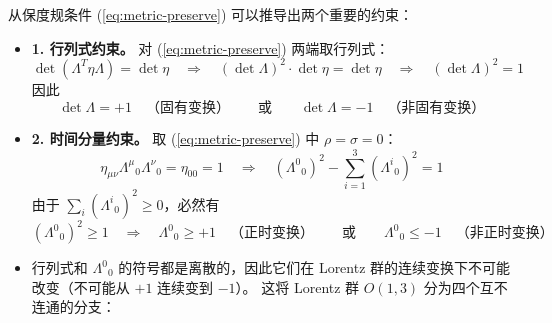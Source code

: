 从保度规条件 (\ref{eq:metric-preserve}) 可以推导出两个重要的约束：\begin{itemize}
  \item \noindent\textbf{1. 行列式约束。}
          对 (\ref{eq:metric-preserve}) 两端取行列式：
          \begin{equation}
            \det(\Lambda^T\eta\Lambda) = \det\eta
            \quad\Longrightarrow\quad
            (\det\Lambda)^2 \cdot \det\eta = \det\eta
            \quad\Longrightarrow\quad
            (\det\Lambda)^2 = 1
          \end{equation}
          因此
          \begin{equation}\label{eq:det-constraint}
            \det\Lambda = +1\quad\text{（固有变换）}
            \qquad\text{或}\qquad
            \det\Lambda = -1\quad\text{（非固有变换）}
          \end{equation}
  \item \noindent\textbf{2. 时间分量约束。}
        取 (\ref{eq:metric-preserve}) 中 $\rho = \sigma = 0$：
        \begin{equation}
          \eta_{\mu\nu}\Lambda^\mu{}_0\Lambda^\nu{}_0 = \eta_{00} = 1
          \quad\Longrightarrow\quad
          (\Lambda^0{}_0)^2 - \sum_{i=1}^{3}(\Lambda^i{}_0)^2 = 1
        \end{equation}
        由于 $\sum_i(\Lambda^i{}_0)^2 \geqslant 0$，必然有
        \begin{equation}\label{eq:time-constraint}
          (\Lambda^0{}_0)^2 \geqslant 1
          \quad\Longrightarrow\quad
          \Lambda^0{}_0 \geqslant +1\quad\text{（正时变换）}
          \qquad\text{或}\qquad
          \Lambda^0{}_0 \leqslant -1\quad\text{（非正时变换）}
        \end{equation}
  \item 行列式和 $\Lambda^0{}_0$ 的符号都是离散的，因此它们在
            Lorentz 群的连续变换下不可能改变（不可能从 $+1$ 连续变到 $-1$）。
            这将 Lorentz 群 $O(1,3)$ 分为四个互不连通的分支：


\end{itemize}
